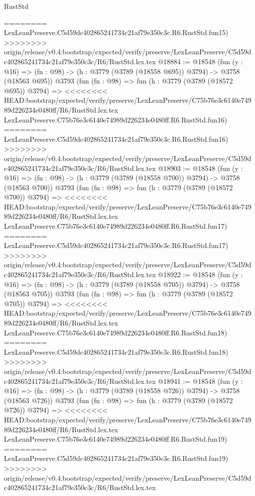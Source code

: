\begin{lexlean}{RustStd}
\begin{coremodule}
{\begin{coremodule}
{{{{{{{{{{{{{{{{{{{{{{{{{{{{{{{========
    LexLeanPreserve.C5d59dc402865241734c21af79e350c3c.R6.RustStd.fun15)
>>>>>>>> origin/release/v0.4:bootstrap/expected/verify/preserve/LexLeanPreserve/C5d59dc402865241734c21af79e350c3c/R6/RustStd.lex.tex
@18884 := @18548
    (fun (y : @16) => (fn : @98) -> (h : @3779 (@3789 (@18558 @695)) @3794) -> @3758 (@18563 @695))
    @3793
    (fun (fn : @98) =>
    fun (h : @3779 (@3789 (@18572 @695)) @3794) =>
<<<<<<<< HEAD:bootstrap/expected/verify/preserve/LexLeanPreserve/C75b76e3c6140e74989d226234e0480ff/R6/RustStd.lex.tex
    LexLeanPreserve.C75b76e3c6140e74989d226234e0480ff.R6.RustStd.fun16)
========
    LexLeanPreserve.C5d59dc402865241734c21af79e350c3c.R6.RustStd.fun16)
>>>>>>>> origin/release/v0.4:bootstrap/expected/verify/preserve/LexLeanPreserve/C5d59dc402865241734c21af79e350c3c/R6/RustStd.lex.tex
@18903 := @18548
    (fun (y : @16) => (fn : @98) -> (h : @3779 (@3789 (@18558 @700)) @3794) -> @3758 (@18563 @700))
    @3793
    (fun (fn : @98) =>
    fun (h : @3779 (@3789 (@18572 @700)) @3794) =>
<<<<<<<< HEAD:bootstrap/expected/verify/preserve/LexLeanPreserve/C75b76e3c6140e74989d226234e0480ff/R6/RustStd.lex.tex
    LexLeanPreserve.C75b76e3c6140e74989d226234e0480ff.R6.RustStd.fun17)
========
    LexLeanPreserve.C5d59dc402865241734c21af79e350c3c.R6.RustStd.fun17)
>>>>>>>> origin/release/v0.4:bootstrap/expected/verify/preserve/LexLeanPreserve/C5d59dc402865241734c21af79e350c3c/R6/RustStd.lex.tex
@18922 := @18548
    (fun (y : @16) => (fn : @98) -> (h : @3779 (@3789 (@18558 @705)) @3794) -> @3758 (@18563 @705))
    @3793
    (fun (fn : @98) =>
    fun (h : @3779 (@3789 (@18572 @705)) @3794) =>
<<<<<<<< HEAD:bootstrap/expected/verify/preserve/LexLeanPreserve/C75b76e3c6140e74989d226234e0480ff/R6/RustStd.lex.tex
    LexLeanPreserve.C75b76e3c6140e74989d226234e0480ff.R6.RustStd.fun18)
========
    LexLeanPreserve.C5d59dc402865241734c21af79e350c3c.R6.RustStd.fun18)
>>>>>>>> origin/release/v0.4:bootstrap/expected/verify/preserve/LexLeanPreserve/C5d59dc402865241734c21af79e350c3c/R6/RustStd.lex.tex
@18941 := @18548
    (fun (y : @16) => (fn : @98) -> (h : @3779 (@3789 (@18558 @726)) @3794) -> @3758 (@18563 @726))
    @3793
    (fun (fn : @98) =>
    fun (h : @3779 (@3789 (@18572 @726)) @3794) =>
<<<<<<<< HEAD:bootstrap/expected/verify/preserve/LexLeanPreserve/C75b76e3c6140e74989d226234e0480ff/R6/RustStd.lex.tex
    LexLeanPreserve.C75b76e3c6140e74989d226234e0480ff.R6.RustStd.fun19)
========
    LexLeanPreserve.C5d59dc402865241734c21af79e350c3c.R6.RustStd.fun19)
>>>>>>>> origin/release/v0.4:bootstrap/expected/verify/preserve/LexLeanPreserve/C5d59dc402865241734c21af79e350c3c/R6/RustStd.lex.tex
}}}}}}}}}}}}}}}}}}}}}}}}}}}}}}}
\end{coremodule}}
\end{coremodule}
\end{lexlean}
